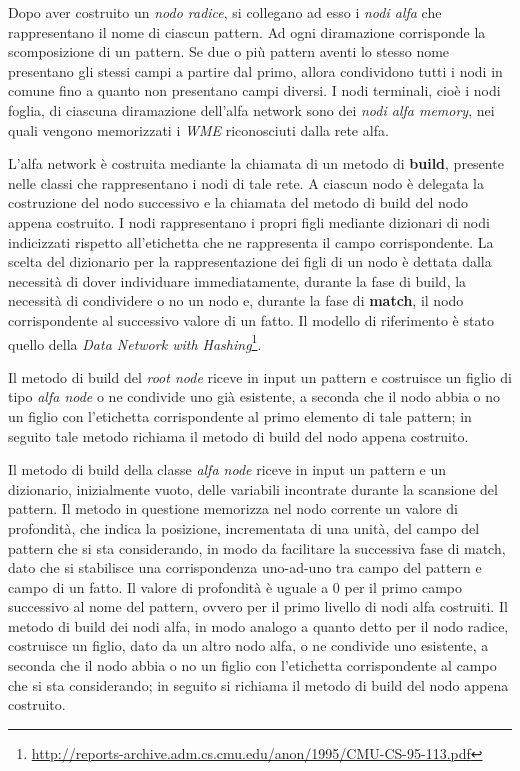 Dopo aver costruito un \emph{nodo radice}, si collegano ad esso i \emph{nodi alfa} che rappresentano il nome di ciascun pattern. Ad ogni diramazione corrisponde la scomposizione di un pattern. Se due o più pattern aventi lo stesso nome presentano gli stessi campi a partire dal primo, allora condividono tutti i nodi in comune fino a quanto non presentano campi diversi. I nodi terminali, cioè i nodi foglia, di ciascuna diramazione dell'alfa network sono dei \emph{nodi alfa memory}, nei quali vengono memorizzati i \emph{WME} riconosciuti dalla rete alfa.

L'alfa network è costruita mediante la chiamata di un metodo di \textbf{build}, presente nelle classi che rappresentano i nodi di tale rete. A ciascun nodo è delegata la costruzione del nodo successivo e la chiamata del metodo di build del nodo appena costruito. I nodi rappresentano i propri figli mediante dizionari di nodi indicizzati rispetto all'etichetta che ne rappresenta il campo corrispondente. La scelta del dizionario per la rappresentazione dei figli di un nodo è dettata dalla necessità di dover individuare immediatamente, durante la fase di build, la necessità di condividere o no un nodo e, durante la fase di \textbf{match}, il nodo corrispondente al successivo valore di un fatto. Il modello di riferimento è stato quello della \emph{Data Network with Hashing}\footnote{\url{http://reports-archive.adm.cs.cmu.edu/anon/1995/CMU-CS-95-113.pdf}}.

Il metodo di build del \emph{root node} riceve in input un pattern e costruisce un figlio di tipo \emph{alfa node} o ne condivide uno già esistente, a seconda che il nodo abbia o no un figlio con l'etichetta corrispondente al primo elemento di tale pattern; in seguito tale metodo richiama il metodo di build del nodo appena costruito.

Il metodo di build della classe \emph{alfa node} riceve in input un pattern e un dizionario, inizialmente vuoto, delle variabili incontrate durante la scansione del pattern. Il metodo in questione memorizza nel nodo corrente un valore di profondità, che indica la posizione, incrementata di una unità, del campo del pattern che si sta considerando, in modo da facilitare la successiva fase di match, dato che si stabilisce una corrispondenza uno-ad-uno tra campo del pattern e campo di un fatto. Il valore di profondità è uguale a 0 per il primo campo successivo al nome del pattern, ovvero per il primo livello di nodi alfa costruiti. Il metodo di build dei nodi alfa, in modo analogo a quanto detto per il nodo radice, costruisce un figlio, dato da un altro nodo alfa, o ne condivide uno esistente, a seconda che il nodo abbia o no un figlio con l'etichetta corrispondente al campo che si sta considerando; in seguito si richiama il metodo di build del nodo appena costruito.

